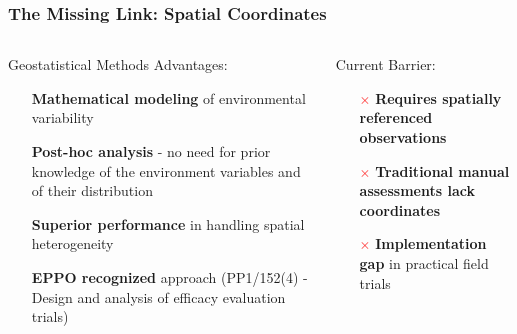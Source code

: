 \documentclass[aspectratio=43]{beamer}
\begin{document}
\begin{frame}
    \frametitle{The Missing Link: Spatial Coordinates}
    
    \begin{columns}
        \begin{column}{0.5\textwidth}
            \begin{block}{Geostatistical Methods Advantages:}
                \begin{itemize}
                    \item[\textcolor{green}{\checkmark}] \textbf{Mathematical modeling} of environmental variability
                    \item[\textcolor{green}{\checkmark}] \textbf{Post-hoc analysis} - no need for prior knowledge of the environment variables and of their distribution
                    \item[\textcolor{green}{\checkmark}] \textbf{Superior performance} in handling spatial heterogeneity
                    \item[\textcolor{green}{\checkmark}] \textbf{EPPO recognized} approach \scriptsize (PP1/152(4) - Design and analysis of efficacy evaluation trials)
                \end{itemize}
            \end{block}
        \end{column}
        
        \begin{column}{0.5\textwidth}
            \begin{alertblock}{Current Barrier:}
                \begin{itemize}
                    \item[\textcolor{red}{\(\times\)}] \textbf{Requires spatially referenced observations}
                    \item[\textcolor{red}{\(\times\)}] \textbf{Traditional manual assessments lack coordinates}
                    \item[\textcolor{red}{\(\times\)}] \textbf{Implementation gap} in practical field trials
                \end{itemize}
            \end{alertblock}
        \end{column}
    \end{columns}
\end{frame}
\end{document}
